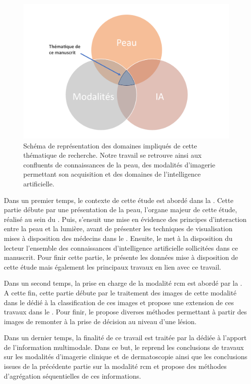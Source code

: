 \begin{figure}[H]
    \centering
    \includegraphics[width=0.8\linewidth]{contents/i_introduction/resources/scheme_our_work.pdf}
    \caption{Schéma de représentation des domaines impliqués de cette thématique de recherche. Notre travail se retrouve ainsi aux confluents de connaissances de la peau, des modalités d'imagerie permettant son acquisition et des domaines de l'intelligence artificielle.}
    \label{fig:scheme_our_work}
\end{figure}\par

Dans un premier temps, le contexte de cette étude est abordé dans la . Cette partie débute par une présentation de la peau, l'organe majeur de cette étude, réalisé au sein du . Puis, s'ensuit une mise en évidence des principes d'interaction entre la peau et la lumière, avant de présenter les techniques de visualisation mises à disposition des médecins dans le . Ensuite, le  met à la disposition du lecteur l'ensemble des connaissances d'intelligence artificielle sollicitées dans ce manuscrit. Pour finir cette partie, le  présente les données mise à disposition de cette étude mais également les principaux travaux en lien avec ce travail.\par

Dans un second temps, la prise en charge de la modalité \gls{rcm} est abordé par la . A cette fin, cette partie débute par le traitement des images de cette modalité dans le  dédié à la classification de ces images et propose une extension de ces travaux dans le . Pour finir, le  propose diverses méthodes permettant à partir des images de remonter à la prise de décision au niveau d'une lésion.\par

Dans un dernier temps, la finalité de ce travail est traitée par la  dédiée à l'apport de l'information multimodale. Dans ce but, le  reprend les conclusions de travaux sur les modalités d'imagerie clinique et de dermatoscopie ainsi que les conclusions issues de la précédente partie sur la modalité \gls{rcm} et propose des méthodes d'agrégation séquentielles de ces informations.\par